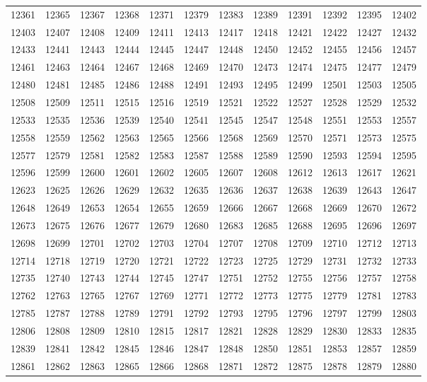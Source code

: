 \begin{center}
\begin{longtable}{llllllllllll}
12361 &12365 &12367 &12368 &12371 &12379 &12383 &12389 &12391 &12392 &12395 &12402 \\
12403 &12407 &12408 &12409 &12411 &12413 &12417 &12418 &12421 &12422 &12427 &12432 \\
12433 &12441 &12443 &12444 &12445 &12447 &12448 &12450 &12452 &12455 &12456 &12457 \\
12461 &12463 &12464 &12467 &12468 &12469 &12470 &12473 &12474 &12475 &12477 &12479 \\
12480 &12481 &12485 &12486 &12488 &12491 &12493 &12495 &12499 &12501 &12503 &12505 \\
12508 &12509 &12511 &12515 &12516 &12519 &12521 &12522 &12527 &12528 &12529 &12532 \\
12533 &12535 &12536 &12539 &12540 &12541 &12545 &12547 &12548 &12551 &12553 &12557 \\
12558 &12559 &12562 &12563 &12565 &12566 &12568 &12569 &12570 &12571 &12573 &12575 \\
12577 &12579 &12581 &12582 &12583 &12587 &12588 &12589 &12590 &12593 &12594 &12595 \\
12596 &12599 &12600 &12601 &12602 &12605 &12607 &12608 &12612 &12613 &12617 &12621 \\
12623 &12625 &12626 &12629 &12632 &12635 &12636 &12637 &12638 &12639 &12643 &12647 \\
12648 &12649 &12653 &12654 &12655 &12659 &12666 &12667 &12668 &12669 &12670 &12672 \\
12673 &12675 &12676 &12677 &12679 &12680 &12683 &12685 &12688 &12695 &12696 &12697 \\
12698 &12699 &12701 &12702 &12703 &12704 &12707 &12708 &12709 &12710 &12712 &12713 \\
12714 &12718 &12719 &12720 &12721 &12722 &12723 &12725 &12729 &12731 &12732 &12733 \\
12735 &12740 &12743 &12744 &12745 &12747 &12751 &12752 &12755 &12756 &12757 &12758 \\
12762 &12763 &12765 &12767 &12769 &12771 &12772 &12773 &12775 &12779 &12781 &12783 \\
12785 &12787 &12788 &12789 &12791 &12792 &12793 &12795 &12796 &12797 &12799 &12803 \\
12806 &12808 &12809 &12810 &12815 &12817 &12821 &12828 &12829 &12830 &12833 &12835 \\
12839 &12841 &12842 &12845 &12846 &12847 &12848 &12850 &12851 &12853 &12857 &12859 \\
12861 &12862 &12863 &12865 &12866 &12868 &12871 &12872 &12875 &12878 &12879 &12880 \\

\end{longtable}
\end{center}
